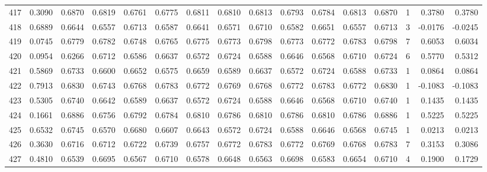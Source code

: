 \begin{tabular}{lrrrrrrrrrrrrrrr}
417 &      0.3090 &  0.6870 &  0.6819 &  0.6761 &  0.6775 &  0.6811 &  0.6810 &  0.6813 &  0.6793 &  0.6784 &   0.6813 &     0.6870 &      1 &                    0.3780 &                     0.3780 \\
418 &      0.6889 &  0.6644 &  0.6557 &  0.6713 &  0.6587 &  0.6641 &  0.6571 &  0.6710 &  0.6582 &  0.6651 &   0.6557 &     0.6713 &      3 &                   -0.0176 &                    -0.0245 \\
419 &      0.0745 &  0.6779 &  0.6782 &  0.6748 &  0.6765 &  0.6775 &  0.6773 &  0.6798 &  0.6773 &  0.6772 &   0.6783 &     0.6798 &      7 &                    0.6053 &                     0.6034 \\
420 &      0.0954 &  0.6266 &  0.6712 &  0.6586 &  0.6637 &  0.6572 &  0.6724 &  0.6588 &  0.6646 &  0.6568 &   0.6710 &     0.6724 &      6 &                    0.5770 &                     0.5312 \\
421 &      0.5869 &  0.6733 &  0.6600 &  0.6652 &  0.6575 &  0.6659 &  0.6589 &  0.6637 &  0.6572 &  0.6724 &   0.6588 &     0.6733 &      1 &                    0.0864 &                     0.0864 \\
422 &      0.7913 &  0.6830 &  0.6743 &  0.6768 &  0.6783 &  0.6772 &  0.6769 &  0.6768 &  0.6772 &  0.6783 &   0.6772 &     0.6830 &      1 &                   -0.1083 &                    -0.1083 \\
423 &      0.5305 &  0.6740 &  0.6642 &  0.6589 &  0.6637 &  0.6572 &  0.6724 &  0.6588 &  0.6646 &  0.6568 &   0.6710 &     0.6740 &      1 &                    0.1435 &                     0.1435 \\
424 &      0.1661 &  0.6886 &  0.6756 &  0.6792 &  0.6784 &  0.6810 &  0.6786 &  0.6810 &  0.6786 &  0.6810 &   0.6786 &     0.6886 &      1 &                    0.5225 &                     0.5225 \\
425 &      0.6532 &  0.6745 &  0.6570 &  0.6680 &  0.6607 &  0.6643 &  0.6572 &  0.6724 &  0.6588 &  0.6646 &   0.6568 &     0.6745 &      1 &                    0.0213 &                     0.0213 \\
426 &      0.3630 &  0.6716 &  0.6712 &  0.6722 &  0.6739 &  0.6757 &  0.6772 &  0.6783 &  0.6772 &  0.6769 &   0.6768 &     0.6783 &      7 &                    0.3153 &                     0.3086 \\
427 &      0.4810 &  0.6539 &  0.6695 &  0.6567 &  0.6710 &  0.6578 &  0.6648 &  0.6563 &  0.6698 &  0.6583 &   0.6654 &     0.6710 &      4 &                    0.1900 &                     0.1729 \\

\end{tabular}
